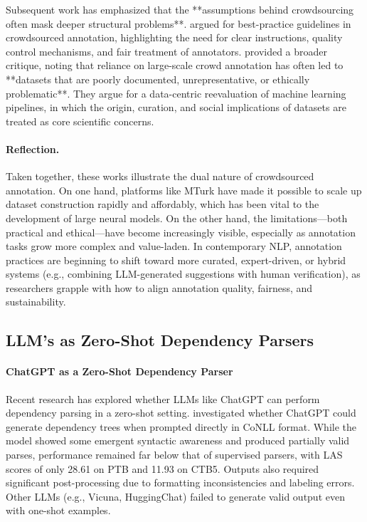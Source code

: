 Subsequent work has emphasized that the **assumptions behind crowdsourcing often mask deeper structural problems**. \citet{sabou2014corpus} argued for best-practice guidelines in crowdsourced annotation, highlighting the need for clear instructions, quality control mechanisms, and fair treatment of annotators. \citet{paullada2021data} provided a broader critique, noting that reliance on large-scale crowd annotation has often led to **datasets that are poorly documented, unrepresentative, or ethically problematic**. They argue for a data-centric reevaluation of machine learning pipelines, in which the origin, curation, and social implications of datasets are treated as core scientific concerns.

\paragraph{Reflection.} Taken together, these works illustrate the dual nature of crowdsourced annotation. On one hand, platforms like MTurk have made it possible to scale up dataset construction rapidly and affordably, which has been vital to the development of large neural models. On the other hand, the limitations—both practical and ethical—have become increasingly visible, especially as annotation tasks grow more complex and value-laden. In contemporary NLP, annotation practices are beginning to shift toward more curated, expert-driven, or hybrid systems (e.g., combining LLM-generated suggestions with human verification), as researchers grapple with how to align annotation quality, fairness, and sustainability.

\subsection{LLM's as Zero-Shot Dependency Parsers}

\paragraph{ChatGPT as a Zero-Shot Dependency Parser}
Recent research has explored whether LLMs like ChatGPT can perform dependency parsing in a zero-shot setting. \citet{lin2023chatgpt} investigated whether ChatGPT could generate dependency trees when prompted directly in CoNLL format. While the model showed some emergent syntactic awareness and produced partially valid parses, performance remained far below that of supervised parsers, with LAS scores of only 28.61 on PTB and 11.93 on CTB5. Outputs also required significant post-processing due to formatting inconsistencies and labeling errors. Other LLMs (e.g., Vicuna, HuggingChat) failed to generate valid output even with one-shot examples.

